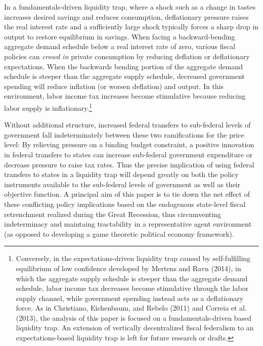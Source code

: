\documentclass[12pt,letterpaper]{article}
\begin{document}
In a fundamentals-driven liquidity trap, where a shock such as a change in tastes increases desired savings and reduces consumption, deflationary pressure raises the real interest rate and a sufficiently large shock typically forces a sharp drop in output to restore equilibrium in savings. When facing a backward-bending aggregate demand schedule below a real interest rate of zero, various fiscal policies can \textit{crowd in} private consumption by reducing deflation or deflationary expectations. When the backwards bending portion of the aggregate demand schedule is steeper than the aggregate supply schedule, decreased government spending will reduce inflation (or worsen deflation) and output. In this environment, labor income tax increases become stimulative because reducing labor supply is inflationary.\footnote{Conversely, in the expectations-driven liquidity trap caused by self-fulfilling equilibrium of low confidence developed by Mertens and Ravn (2014), in which the aggregate supply schedule is steeper than the aggregate demand schedule, labor income tax decreases become stimulative through the labor supply channel, while government spending instead acts as a deflationary force. As in Christiano, Eichenbaum, and Rebelo (2011) and Correia et al. (2013), the analysis of this paper is focused on a fundamentals-driven based liquidity trap. An extension of vertically decentralized fiscal federalism to an expectations-based liquidity trap is left for future research or drafts.} 

Without additional structure, increased federal transfers to sub-federal levels of government fall indeterminately between these two ramifications for the price level:  By relieving pressure on a binding budget constraint, a positive innovation in federal transfers to states can increase sub-federal government expenditure or decrease pressure to raise tax rates. Thus the precise implication of using federal transfers to states in a liquidity trap will depend greatly on both the policy instruments available to the sub-federal levels of government as well as their objective function. A principal aim of this paper is to tie down the net effect of these conflicting policy implications based on the endogenous state-level fiscal retrenchment realized during the Great Recession, thus circumventing indeterminacy and maintaing tractability in a representative agent environment (as opposed to developing a game theoretic political economy framework). 
\end{document}

